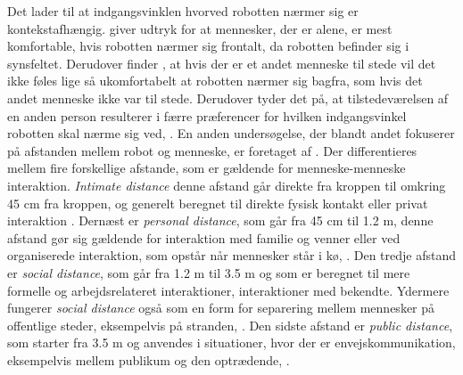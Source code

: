 Det lader til at indgangsvinklen hvorved robotten nærmer sig er kontekstafhængig. \textcite[s. 41]{PDF:GroupVSIndividual} giver udtryk for at mennesker, der er alene, er mest komfortable, hvis robotten nærmer sig frontalt, da robotten befinder sig i synsfeltet. Derudover finder \textcite[s. 48]{PDF:GroupVSIndividual}, at hvis der er et andet menneske til stede vil det ikke føles lige så ukomfortabelt at robotten nærmer sig bagfra, som hvis det andet menneske ikke var til stede. Derudover tyder det på, at tilstedeværelsen af en anden person resulterer i færre præferencer for hvilken indgangsvinkel robotten skal nærme sig ved, \parencite[s. 48]{PDF:GroupVSIndividual}.\blankline
%
En anden undersøgelse, der blandt andet fokuserer på afstanden mellem robot og menneske, er foretaget af \textcite{PDF:HumanRobotEmodiedInteraction}. Der differentieres mellem fire forskellige afstande, som er gældende for menneske-menneske interaktion. \textit{Intimate distance} denne afstand går direkte fra kroppen til omkring 45 cm fra kroppen, og generelt beregnet til direkte fysisk kontakt eller privat interaktion \parencite[s. 165]{PDF:HumanRobotEmodiedInteraction}. Dernæst er \textit{personal distance}, som går fra 45 cm til 1.2 m, denne afstand gør sig gældende for interaktion med familie og venner eller ved organiserede interaktion, som opstår når mennesker står i kø, \parencite[s. 165]{PDF:HumanRobotEmodiedInteraction}. Den tredje afstand er \textit{social distance}, som går fra 1.2 m til 3.5 m og som er beregnet til mere formelle og arbejdsrelateret interaktioner, interaktioner med bekendte. Ydermere fungerer \textit{social distance} også som en form for separering mellem mennesker på offentlige steder, eksempelvis på stranden, \parencite[s. 165]{PDF:HumanRobotEmodiedInteraction}. Den sidste afstand er \textit{public distance}, som starter fra 3.5 m og anvendes i situationer, hvor der er envejskommunikation, eksempelvis mellem publikum og den optrædende, \parencite[s. 165]{PDF:HumanRobotEmodiedInteraction}.

